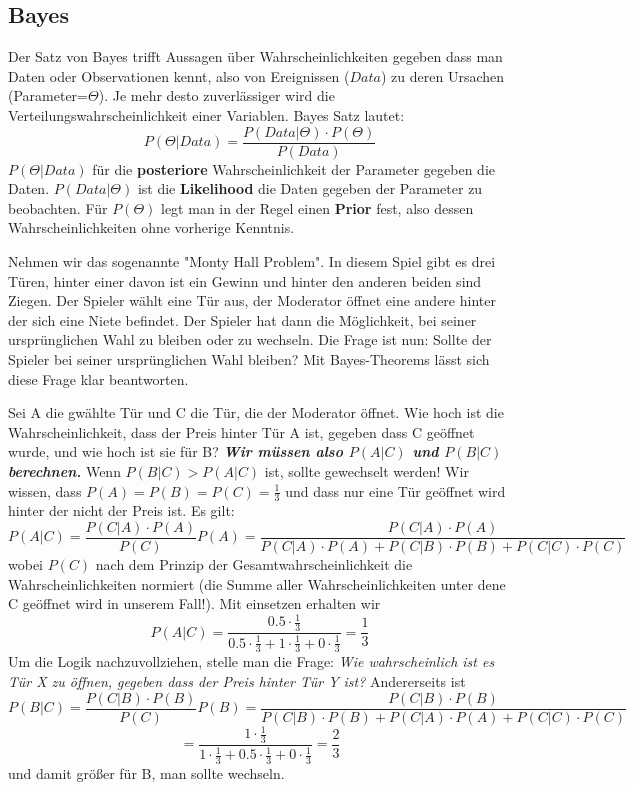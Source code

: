\documentclass[letterpaper, titlepage]{article}
\begin{document}
\vspace{0.35cm}

\subsection{Bayes}\label{Bayes}
Der Satz von Bayes trifft Aussagen über Wahrscheinlichkeiten gegeben dass man Daten oder Observationen kennt, also von Ereignissen ($Data$) zu deren Ursachen (Parameter=$\Theta$). Je mehr desto zuverlässiger wird die Verteilungswahrscheinlichkeit einer Variablen. Bayes Satz lautet:
$$P(\Theta|Data) = \frac{P(Data|\Theta) \cdot P(\Theta)}{P(Data)}$$
$P(\Theta|Data)$ für die \textbf{posteriore} Wahrscheinlichkeit der Parameter gegeben die Daten. $P(Data|\Theta)$ ist die \textbf{Likelihood} die Daten gegeben der Parameter zu beobachten. Für $P(\Theta)$ legt man in der Regel einen \textbf{Prior} fest, also dessen Wahrscheinlichkeiten ohne vorherige Kenntnis. 

\vspace{0.35cm}

Nehmen wir das sogenannte "Monty Hall Problem". In diesem Spiel gibt es drei Türen, hinter einer davon ist ein Gewinn und hinter den anderen beiden sind Ziegen. Der Spieler wählt eine Tür aus, der Moderator öffnet eine andere hinter der sich eine Niete befindet. Der Spieler hat dann die Möglichkeit, bei seiner ursprünglichen Wahl zu bleiben oder zu wechseln. Die Frage ist nun: Sollte der Spieler bei seiner ursprünglichen Wahl bleiben? Mit Bayes-Theorems lässt sich diese Frage klar beantworten. 

\vspace{0.35cm}

Sei A die gwählte Tür und C  die Tür, die der Moderator öffnet. Wie hoch ist die Wahrscheinlichkeit, dass der Preis hinter Tür A ist, gegeben dass C geöffnet wurde, und wie hoch ist sie für B? \textbf{\textit{Wir müssen also $P(A|C)$ und $P(B|C)$ berechnen.}} Wenn $P(B|C) > P(A|C)$ ist, sollte gewechselt werden! Wir wissen, dass $P(A)=P(B)=P(C)=\frac{1}{3}$ und dass nur eine Tür geöffnet wird hinter der nicht der Preis ist. Es gilt:
$$
P(A|C) = \frac{P(C|A) \cdot P(A)}{P(C)} P(A) = \frac{P(C|A) \cdot P(A)}{P(C|A) \cdot P(A) + P(C|B) \cdot P(B) + P(C|C) \cdot P(C)}
$$
wobei $P(C)$ nach dem Prinzip der Gesamtwahrscheinlichkeit die Wahrscheinlichkeiten normiert (die Summe aller Wahrscheinlichkeiten unter dene C geöffnet wird in unserem Fall!). Mit einsetzen erhalten wir
$$
P(A|C) = \frac{0.5 \cdot \frac{1}{3}}{0.5 \cdot \frac{1}{3} + 1 \cdot \frac{1}{3} + 0 \cdot \frac{1}{3}} = \frac{1}{3}
$$
Um die Logik nachzuvollziehen, stelle man die Frage: \textit{Wie wahrscheinlich ist es Tür X zu öffnen, gegeben dass der Preis hinter Tür Y ist?} Andererseits ist 
$$
P(B|C) = \frac{P(C|B) \cdot P(B)}{P(C)} P(B) = \frac{P(C|B) \cdot P(B)}{P(C|B) \cdot P(B) + P(C|A) \cdot P(A) + P(C|C) \cdot P(C)} 
$$
$$
= \frac{1 \cdot \frac{1}{3}}{1 \cdot \frac{1}{3} + 0.5 \cdot \frac{1}{3} + 0 \cdot \frac{1}{3}} = \frac{2}{3}
$$ 
\hfill \break
\vspace{0.35cm}
und damit größer für B, man sollte wechseln.
\end{document}
